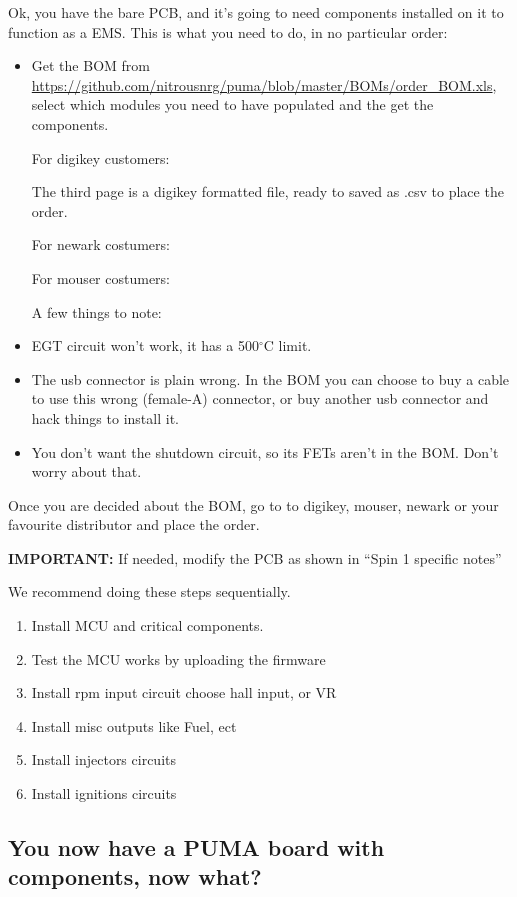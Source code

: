 \documentclass[12pt,a4paper,titlepage]{article}
\begin{document}
Ok, you have the bare PCB, and it's going to need components installed on it to function as a EMS. This is what you need to do, in no particular order:
\begin{itemize}
\item Get the BOM from \url{https://github.com/nitrousnrg/puma/blob/master/BOMs/order_BOM.xls}, select which modules you need to have populated and the get the components.

For digikey customers:

The third page is a digikey formatted file, ready to saved as .csv to place the order.

For newark costumers:



For mouser costumers:




A few things to note:
\item EGT circuit won't work, it has a 500$^{\circ}$C limit.
\item The usb connector is plain wrong. In the BOM you can choose to buy a cable to use this wrong (female-A) connector, or buy another usb connector and hack things to install it.
\item You don't want the shutdown circuit, so its FETs aren't in the BOM. Don't worry about that.
\end{itemize}

Once you are decided about the BOM, go to to digikey, mouser, newark or your favourite distributor and place the order.
\newline

\textbf{IMPORTANT:} If needed, modify the PCB as shown in ``Spin 1 specific notes''
\newline

We recommend doing these steps sequentially.

\begin{enumerate}
\item Install MCU and critical components.
\item Test the MCU works by uploading the firmware
\item Install rpm input circuit choose hall input, or VR
\item Install misc outputs like Fuel, ect
\item Install injectors circuits
\item Install ignitions circuits
\end{enumerate}


\subsection{You now have a PUMA board with components, now what?}
\end{document}
